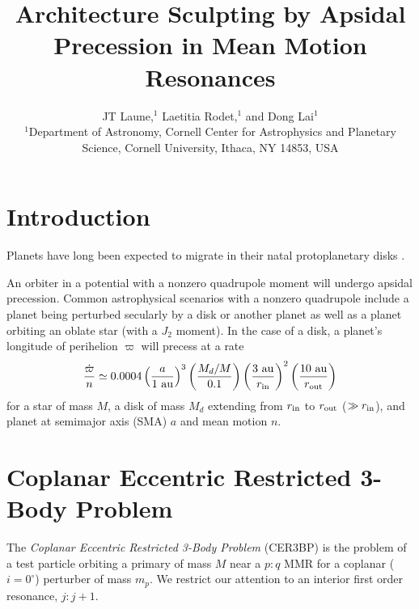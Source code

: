 \documentclass[usenatbib,twocolumn]{mnras}
\title[Apsidal Precession in MMR]{Architecture Sculpting by Apsidal Precession in Mean Motion Resonances}
\author[Laune et al.]{ JT Laune,$^{1}$ Laetitia Rodet,$^{1}$ and Dong
  Lai$^{1}$
  \\
  $^{1}$Department of Astronomy, Cornell Center for Astrophysics and
  Planetary Science, Cornell University, Ithaca, NY 14853, USA \\}
\begin{document}
\maketitle

\section{Introduction}
    Planets have long been expected to migrate in their natal protoplanetary disks \citep[PPDs; e.g.][]{nelson00_migrat_growt_protop_protos_discs}.

    An orbiter in a potential with a nonzero quadrupole moment will undergo apsidal precession. 
    Common astrophysical scenarios with a nonzero quadrupole include a planet being perturbed secularly by a disk or another planet as well as a planet orbiting an oblate star (with a $J_2$ moment). 
    In the case of a disk, a planet's longitude of perihelion $\varpi$ will precess at a rate
    \begin{equation}
        \frac{\dot\varpi}{n} \simeq 0.0004\left(\frac{a}{1~\rm{au}}\right)^3\left(\frac{M_d/M}{0.1}\right)\left(\frac{3~\rm{au}}{r_{\rm in}}\right)^2\left(\frac{10~\rm{au}}{r_{\rm out}}\right)
    \end{equation}
    for a star of mass $M$, a disk of mass $M_d$ extending from $r_{\rm in}$ to $r_{\rm out}$ ($\gg r_{\rm in}$), and planet at semimajor axis (SMA) $a$ and mean motion $n$.


\section{Coplanar Eccentric Restricted 3-Body Problem}
\label{sec:CER3BP}
The \emph{Coplanar Eccentric Restricted 3-Body Problem} (CER3BP) is the problem of a test particle orbiting a primary of mass $M$ near a $p:q$ MMR for a coplanar ($i=0^\circ$) perturber of mass $m_p$.
We restrict our attention to an interior first order resonance, $j:j+1$.
\end{document}
